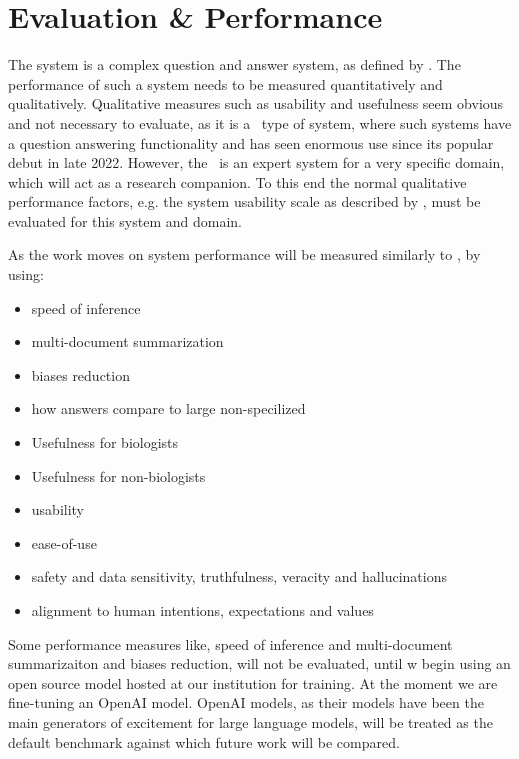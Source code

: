 \section{Evaluation \& Performance}

The system is a complex question and answer system, as defined by \cite{Daull:2023:complex}.
The performance of such a system needs to be measured quantitatively and qualitatively.
Qualitative measures such as usability and usefulness seem obvious and not necessary to evaluate, as it is a \gpts\ type of system, where such systems have a question answering functionality and has seen enormous use since its popular debut in late 2022.
However, the \project\ is an expert system for a very specific domain, which will act as a research companion.
To this end the normal qualitative performance factors, e.g. the system usability scale as described by \cite{Blattgerste:2022}, must be evaluated for this system and domain.


As the work moves on system performance will be measured similarly to \cite{Daull:2023:complex}, by using:
\begin{itemize}
    \item speed of inference
    \item multi-document summarization
    \item biases reduction
    \item how answers compare to large non-specilized \llms\
    \item Usefulness for biologists
    \item Usefulness for non-biologists
    \item usability
    \item ease-of-use
    \item safety and data sensitivity, truthfulness, veracity and hallucinations
    \item alignment to human intentions, expectations and values
\end{itemize}

Some performance measures like, speed of inference and multi-document summarizaiton and biases reduction, will not be evaluated, until w begin using an open source model hosted at our institution for training.
At the moment we are fine-tuning an OpenAI model.
OpenAI models, as their models have been the main generators of excitement for large language models, will be treated as the default benchmark against which future work will be compared.

